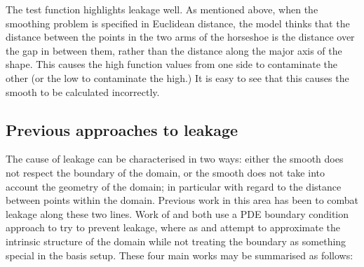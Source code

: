 The test function highlights leakage well. As mentioned above, when the smoothing problem is specified in Euclidean distance, the model thinks that the distance between the points in the two arms of the horseshoe is the distance over the gap in between them, rather than the distance along the major axis of the shape. This causes the high function values from one side to contaminate the other (or the low to contaminate the high.) It is easy to see that this causes the smooth to be calculated incorrectly.
		
\subsection{Previous approaches to leakage}

The cause of leakage can be characterised in two ways: either the smooth does not respect the boundary of the domain, or the smooth does not take into account the geometry of the domain; in particular with regard to the distance between points within the domain. Previous work in this area has been to combat leakage along these two lines. Work of \cite{ramsay} and \cite{soap} both use a PDE boundary condition approach to try to prevent leakage, where as \cite{wangranalli} and \cite{eilerstalk}  attempt to approximate the intrinsic structure of the domain while not treating the boundary as something special in the basis setup. These four main works may be summarised as follows:

